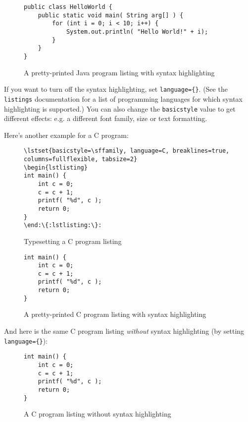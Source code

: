 \begin{figure}[hbt!]
\lstset{basicstyle=\small\ttfamily, language=Java, breaklines=true, columns=fullflexible, framesep=10pt, xleftmargin=16pt, tabsize=2}
\begin{lstlisting}
public class HelloWorld {
	public static void main( String arg[] ) {
        for (int i = 0; i < 10; i++) {
			System.out.println( "Hello World!" + i);
		}
	}
}
\end{lstlisting}
\caption{A pretty-printed Java program listing with syntax highlighting}
\end{figure}


If you want to turn off the syntax highlighting, set \verb|language={}|.  (See the \verb|listings| documentation for a list of programming languages for which syntax highlighting is supported.)  You can also change the \verb|basicstyle| value to get different effects: e.g. a different font family, size or text formatting.

Here's another example for a C program:

\begin{figure}[hbt!]
\begin{lstlisting}[escapechar={:}, texcl=false,language={}]
\lstset{basicstyle=\sffamily, language=C, breaklines=true, columns=fullflexible, tabsize=2}
\begin{lstlisting}
int main() {
	int c = 0;
	c = c + 1;
	printf( "%d", c );
	return 0;
}
\end:\{:lstlisting:\}:
\end{lstlisting}
\caption{Typesetting a C program listing}\label{fig:lst:c}
\end{figure}

\begin{figure}[hbt!]
\lstset{basicstyle=\sffamily, language=C, breaklines=true, columns=fullflexible, framesep=10pt, xleftmargin=.4\textwidth, tabsize=4}
\begin{lstlisting}
int main() {
	int c = 0;
	c = c + 1;
	printf( "%d", c );
	return 0;
}
\end{lstlisting}
\caption{A pretty-printed C program listing with syntax highlighting}
\end{figure}


And here is the same C program listing \emph{without} syntax highlighting (by setting \verb|language={}|):

\begin{figure}[H]

\begin{lstlisting}
int main() {
	int c = 0;
	c = c + 1;
	printf( "%d", c );
	return 0;
}
\end{lstlisting}
\caption{A C program listing without syntax highlighting}
\end{figure}
